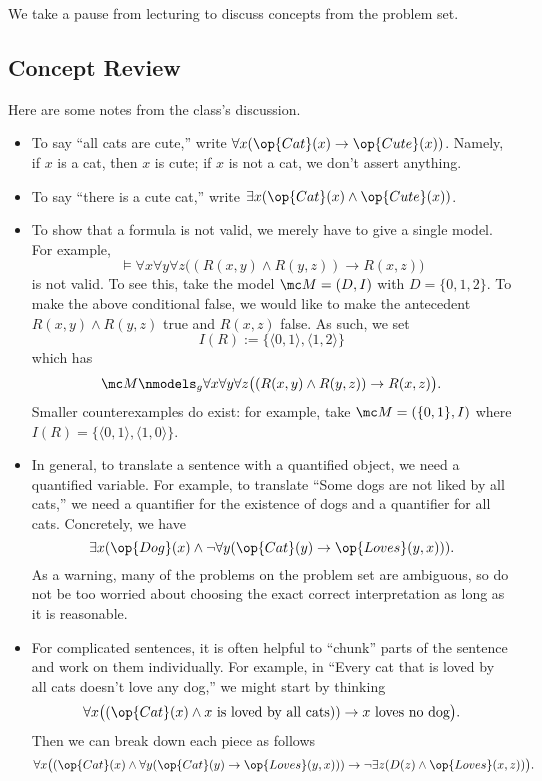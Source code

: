 \documentclass[../notes.tex]{subfiles}
\begin{document}

We take a pause from lecturing to discuss concepts from the problem set.

\subsection{Concept Review}
Here are some notes from the class's discussion.
\begin{itemize}
	\item To say ``all cats are cute,'' write $\forall x(\op{Cat}(x)\to\op{Cute}(x))$. Namely, if $x$ is a cat, then $x$ is cute; if $x$ is not a cat, we don't assert anything.
	\item To say ``there is a cute cat,'' write $\exists x(\op{Cat}(x)\land\op{Cute}(x))$.
	\item To show that a formula is not valid, we merely have to give a single model. For example,
	\[\models\forall x\forall y\forall z\big((R(x,y)\land R(y,z))\to R(x,z)\big)\]
	is not valid. To see this, take the model $\mc M=(D,I)$ with $D=\{0,1,2\}$. To make the above conditional false, we would like to make the antecedent $R(x,y)\land R(y,z)$ true and $R(x,z)$ false. As such, we set
	\[I(R):=\{\langle0,1\rangle,\langle1,2\rangle\}\]
	which has
	\[\mc M\nmodels_{g}\forall x\forall y\forall z\big((R(x,y)\land R(y,z))\to R(x,z)\big).\]
	Smaller counterexamples do exist: for example, take $\mc M=(\{0,1\},I)$ where $I(R)=\{\langle0,1\rangle,\langle1,0\rangle\}$.
	\item In general, to translate a sentence with a quantified object, we need a quantified variable. For example, to translate ``Some dogs are not liked by all cats,'' we need a quantifier for the existence of dogs and a quantifier for all cats. Concretely, we have
	\[\exists x(\op{Dog}(x)\land\lnot\forall y(\op{Cat}(y)\to\op{Loves}(y,x))).\]
	As a warning, many of the problems on the problem set are ambiguous, so do not be too worried about choosing the exact correct interpretation as long as it is reasonable.
	\item For complicated sentences, it is often helpful to ``chunk'' parts of the sentence and work on them individually. For example, in ``Every cat that is loved by all cats doesn't love any dog,'' we might start by thinking
	\[\forall x\big((\op{Cat}(x)\land\text{$x$ is loved by all cats}))\to\text{$x$ loves no dog}\big).\]
	Then we can break down each piece as follows
	\[\forall x\big((\op{Cat}(x)\land\forall y(\op{Cat}(y)\to\op{Loves}(y,x)))\to\lnot\exists z(D(z)\land\op{Loves}(x,z))\big).\]

\end{itemize}
\end{document}
